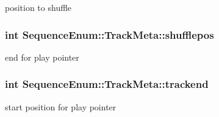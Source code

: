 position to shuffle 

\hypertarget{structSequenceEnum_1_1TrackMeta_ac5dddcccca4bf743631453d331fd10ed}{
\subsubsection[{shufflepos}]{\setlength{\rightskip}{0pt plus 5cm}int Sequence\-Enum\-::\-Track\-Meta\-::shufflepos}}\label{structSequenceEnum_1_1TrackMeta_ac5dddcccca4bf743631453d331fd10ed}


end for play pointer 

\hypertarget{structSequenceEnum_1_1TrackMeta_a83b4013eff9689ef668b7eeb438b63d6}{
\subsubsection[{trackend}]{\setlength{\rightskip}{0pt plus 5cm}int Sequence\-Enum\-::\-Track\-Meta\-::trackend}}\label{structSequenceEnum_1_1TrackMeta_a83b4013eff9689ef668b7eeb438b63d6}


start position for play pointer 

